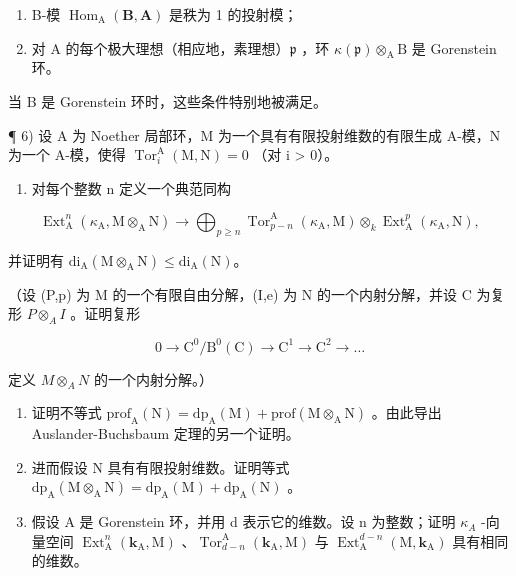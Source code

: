 \begin{enumerate}
\def\labelenumi{(\roman{enumi})}
\item
  B-模 \(\operatorname{Hom}_{\mathrm{A}}(\mathbf{B},\mathbf{A})\) 是秩为 1 的投射模；
\item
  对 A 的每个极大理想（相应地，素理想）\(\mathfrak{p}\) ，环 \(\kappa(\mathfrak{p})\otimes_{\mathrm{A}}\mathrm{B}\) 是 Gorenstein 环。
\end{enumerate}

当 B 是 Gorenstein 环时，这些条件特别地被满足。

¶ 6) 设 A 为 Noether 局部环，M 为一个具有有限投射维数的有限生成 A-模，N 为一个 A-模，使得 \(\operatorname{Tor}_{i}^{\mathrm{A}}(\mathrm{M},\mathrm{N}) = 0\) （对 i \textgreater{} 0）。

\begin{enumerate}
\def\labelenumi{\alph{enumi})}
\tightlist
\item
  对每个整数 n 定义一个典范同构
\end{enumerate}

\[
\operatorname{Ext} _ {\mathrm{A}} ^ {n} (\kappa_ {\mathrm{A}}, \mathrm{M} \otimes_ {\mathrm{A}} \mathrm{N}) \longrightarrow \bigoplus_ {p \geqslant n} \operatorname{Tor} _ {p - n} ^ {\mathrm{A}} (\kappa_ {\mathrm{A}}, \mathrm{M}) \otimes_ {k} \operatorname{Ext} _ {\mathrm{A}} ^ {p} (\kappa_ {\mathrm{A}}, \mathrm{N}),
\]

并证明有 \(\mathrm{di}_{\mathrm{A}}(\mathrm{M}\otimes_{\mathrm{A}}\mathrm{N})\leqslant \mathrm{di}_{\mathrm{A}}(\mathrm{N})\)。

（设 (P,p) 为 M 的一个有限自由分解，(I,e) 为 N 的一个内射分解，并设 C 为复形 \(P \otimes_A I\) 。证明复形

\[
0 \to \mathrm{C} ^ {0} / \mathrm{B} ^ {0} (\mathrm{C}) \to \mathrm{C} ^ {1} \to \mathrm{C} ^ {2} \to \dots
\]

定义 \(M \otimes_A N\) 的一个内射分解。）

\begin{enumerate}
\def\labelenumi{\alph{enumi})}
\setcounter{enumi}{1}
\item
  证明不等式 \(\mathrm{prof}_{\mathrm{A}}(\mathrm{N}) = \mathrm{dp}_{\mathrm{A}}(\mathrm{M}) + \mathrm{prof}(\mathrm{M} \otimes_{\mathrm{A}} \mathrm{N})\) 。由此导出 Auslander-Buchsbaum 定理的另一个证明。
\item
  进而假设 N 具有有限投射维数。证明等式 \(\mathrm{dp}_{\mathrm{A}}(\mathrm{M}\otimes_{\mathrm{A}}\mathrm{N})=\mathrm{dp}_{\mathrm{A}}(\mathrm{M})+\mathrm{dp}_{\mathrm{A}}(\mathrm{N})\) 。
\item
  假设 A 是 Gorenstein 环，并用 d 表示它的维数。设 n 为整数；证明 \(\kappa_{A}\) -向量空间 \(\operatorname{Ext}_{\mathrm{A}}^{n}(\mathbf{k}_{\mathrm{A}},\mathrm{M})\) 、\(\operatorname{Tor}_{d-n}^{\mathrm{A}}(\mathbf{k}_{\mathrm{A}},\mathrm{M})\) 与 \(\operatorname{Ext}_{\mathrm{A}}^{d-n}(\mathrm{M},\mathbf{k}_{\mathrm{A}})\) 具有相同的维数。
\end{enumerate}

